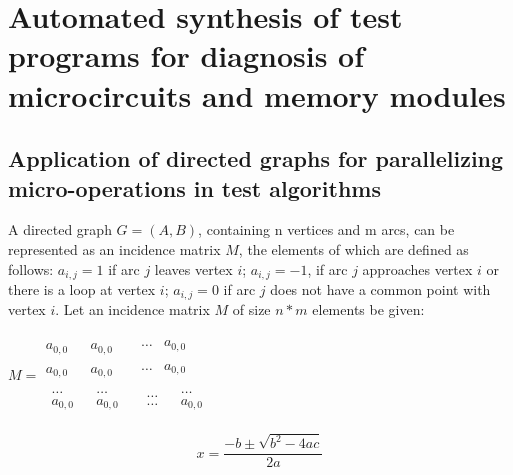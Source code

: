 \documentclass[12pt]{article}
\begin{document}
\tableofcontents
\newpage

\section{Automated synthesis of test programs for diagnosis of microcircuits and memory modules}
\subsection{Application of directed graphs for parallelizing micro-operations in test algorithms}  

\vspace{3mm}
A directed graph $G=(A,B)$, containing n vertices and m arcs, can be represented as an incidence matrix $M$, the elements of
which are defined as follows: $a_{i,j} = 1$ if arc $j$ leaves vertex $i$; $a_{i,j} = -1$, if arc $j$ approaches vertex $i$ or there is a loop at vertex $i$; $a_{i, j} = 0$ if arc $j$ does not have a common point with vertex $i$. Let an incidence matrix $M$ of size $n*m$ elements be given:\newline

{\centering
$M =
\begin{matrix}a_{0,0}&a_{0,0}&
\begin{matrix}\dots{}&a_{0,0}\end{matrix}\\a_{0,0}&a_{0,0}&
\begin{matrix}\dots{}&a_{0,0}\end{matrix}\\
\begin{matrix}\dots{}\\a_{0,0}\end{matrix}&
\begin{matrix}\dots{}\\a_{0,0}\end{matrix}&
\begin{matrix}\begin{matrix}\dots{}\\\dots{}\end{matrix}&
\begin{matrix}\dots{}\\a_{0,0}\end{matrix}\end{matrix}
\end{matrix}$
\par}
\vspace{4mm}
\[x = \frac{-b\pm \sqrt{b^2 - 4ac}}{2a}\]
\end{document}
